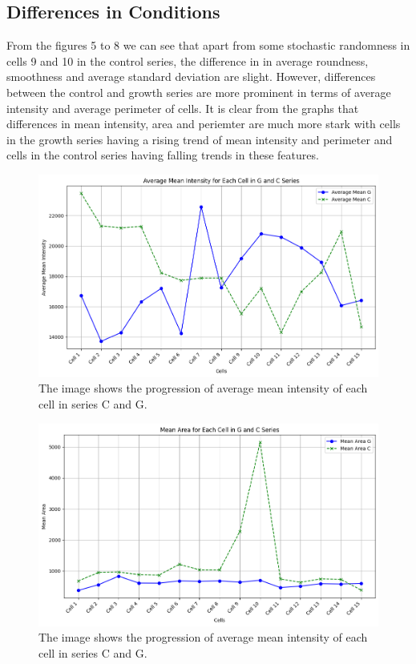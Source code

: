 \documentclass{article}
\begin{document}
\newpage
\subsection*{Differences in Conditions}
From the figures 5 to 8 we can see that apart from some stochastic randomness in cells 9 and 10 in the control series, the difference in in average roundness, smoothness and average standard deviation are slight. However, differences between the control and growth series are more prominent in terms of average intensity and average perimeter of cells. It is clear from the graphs that differences in mean intensity, area and periemter are much more stark with cells in the growth series having a rising trend of mean intensity and perimeter and cells in the control series having falling trends in these features. 

\begin{figure}[h!]
\centering
\includegraphics[width=0.75\linewidth]{Report/RImages/Graphs/average_mean_1.png}
\caption{\label{fig:Mean_Distance}The image shows the progression of average mean intensity of each cell in series C and G.}
\end{figure}

\begin{figure}[h!]
\centering
\includegraphics[width=0.75\linewidth]{Report/RImages/Graphs/average_area.png}
\caption{\label{fig:Mean_Distance}The image shows the progression of average mean intensity of each cell in series C and G.}
\end{figure}
\end{document}
